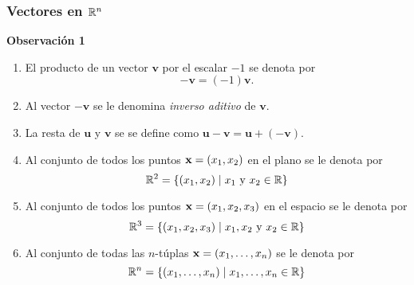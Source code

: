 {\nologo
\begin{frame}\frametitle{Vectores en $\mathbb{R}^n$}

\vspace{-3mm}
\begin{alertblock}{\textbf{Observación 1}}
	\begin{enumerate}
		\item[\labelname{$a$}] El producto de un vector $\mathbf{v}$ por el escalar $-1$ se denota por
		\[
		-\mathbf{v} = (-1)\mathbf{v}.
		\]
		
		\vspace{0mm}	
		\item[\labelname{$b$}] Al vector $-\mathbf{v}$ se le denomina \textit{inverso aditivo} de $\mathbf{v}$.
		
		\vspace{2mm}	
		\item[\labelname{$c$}] La resta de $\mathbf{u}$ y $\mathbf{v}$ se se define como 
		$\mathbf{u}-\mathbf{v} = \mathbf{u} + (-\mathbf{v}) $.

		\vspace{2mm}	
		\item[\labelname{$d$}] Al conjunto de todos los puntos $\mathbf{x} = (x_1,x_2)$ en el plano se le denota por 
		\[
		\mathbb{R}^2 = \{ (x_1,x_2) \mid x_1 \ \mbox{y} \  x_2 \in \mathbb{R} \}
		\]

		\vspace{1mm}	
		\item[\labelname{$e$}] Al conjunto de todos los puntos $\mathbf{x} = (x_1,x_2,x_3)$ en el espacio se le denota por 
		\[
		\mathbb{R}^3 = \{ (x_1,x_2,x_3) \mid x_1, x_2 \ \mbox{y} \  x_2 \in \mathbb{R} \}
		\]

		\vspace{2mm}	
		\item[\labelname{$f$}] Al conjunto de todas las $n$-túplas $\mathbf{x} = (x_1,\hdots, x_n)$ se le denota por 
		\[
		\mathbb{R}^n = \{ (x_1,\hdots, x_n) \mid x_1, \hdots, x_n \in \mathbb{R} \}
		\]
	\end{enumerate}
\end{alertblock}

\end{frame}
}


\subsection{}

